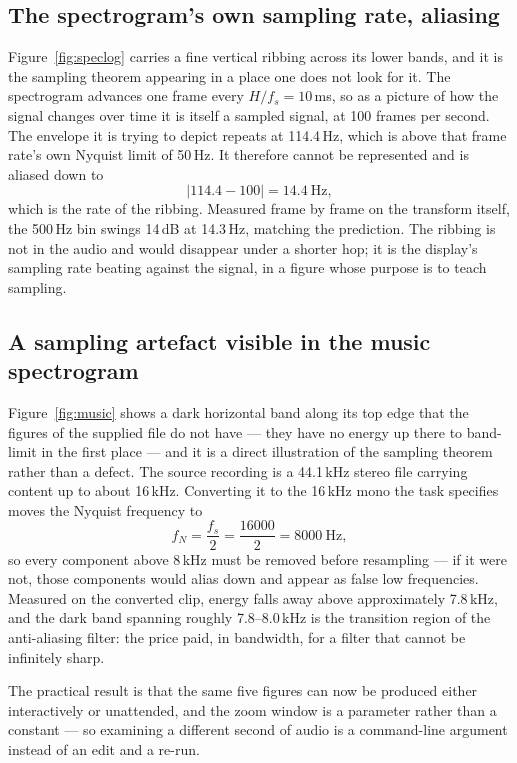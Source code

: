 \documentclass[11pt]{article}
\begin{document}
\subsection*{The spectrogram's own sampling rate, aliasing}

Figure~\ref{fig:speclog} carries a fine vertical ribbing across its lower
bands, and it is the sampling theorem appearing in a place one does not look
for it. The spectrogram advances one frame every $H/f_s = 10$\,ms, so as a
picture of how the signal changes over time it is itself a sampled signal, at
100 frames per second. The envelope it is trying to depict repeats at
114.4\,Hz, which is above that frame rate's own Nyquist limit of 50\,Hz. It
therefore cannot be represented and is aliased down to
\[
  |114.4 - 100| = 14.4\ \text{Hz},
\]
which is the rate of the ribbing. Measured frame by frame on the transform
itself, the 500\,Hz bin swings 14\,dB at 14.3\,Hz, matching the prediction.
The ribbing is not in the audio and would disappear under a shorter hop; it is
the display's sampling rate beating against the signal, in a figure whose
purpose is to teach sampling.

\subsection*{A sampling artefact visible in the music spectrogram}

Figure~\ref{fig:music} shows a dark horizontal band along its top edge that the
figures of the supplied file do not have --- they have no energy up there to
band-limit in the first place --- and it is a direct illustration of the
sampling theorem rather than a defect. The source recording is a 44.1\,kHz
stereo file
carrying content up to about 16\,kHz. Converting it to the 16\,kHz mono the
task specifies moves the Nyquist frequency to
\[
  f_N = \frac{f_s}{2} = \frac{16000}{2} = 8000\ \text{Hz},
\]
so every component above 8\,kHz must be removed before resampling --- if it
were not, those components would alias down and appear as false low
frequencies. Measured on the converted clip, energy falls away above
approximately 7.8\,kHz, and the dark band spanning roughly 7.8--8.0\,kHz is
the transition region of the anti-aliasing filter: the price paid, in bandwidth,
for a filter that cannot be infinitely sharp.

The practical result is that the same five figures can now be produced either
interactively or unattended, and the zoom window is a parameter rather than a
constant --- so examining a different second of audio is a command-line
argument instead of an edit and a re-run.
\end{document}
